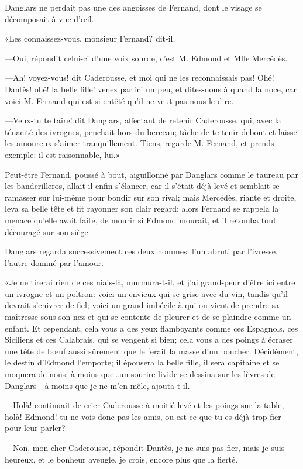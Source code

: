 Danglars ne perdait pas une des angoisses de Fernand, dont le visage se décomposait à vue d'œil.

«Les connaissez-vous, monsieur Fernand? dit-il.

—Oui, répondit celui-ci d'une voix sourde, c'est M. Edmond et Mlle Mercédès.

—Ah! voyez-vous! dit Caderousse, et moi qui ne les reconnaissais pas! Ohé! Dantès! ohé! la belle fille! venez par ici un peu, et dites-nous à quand la noce, car voici M. Fernand qui est si entêté qu'il ne veut pas nous le dire.

—Veux-tu te taire! dit Danglars, affectant de retenir Caderousse, qui, avec la ténacité des ivrognes, penchait hors du berceau; tâche de te tenir debout et laisse les amoureux s'aimer tranquillement. Tiens, regarde M. Fernand, et prends exemple: il est raisonnable, lui.»

Peut-être Fernand, poussé à bout, aiguillonné par Danglars comme le taureau par les banderilleros, allait-il enfin s'élancer, car il s'était déjà levé et semblait se ramasser sur lui-même pour bondir sur son rival; mais Mercédès, riante et droite, leva sa belle tête et fit rayonner son clair regard; alors Fernand se rappela la menace qu'elle avait faite, de mourir si Edmond mourait, et il retomba tout découragé sur son siège.

Danglars regarda successivement ces deux hommes: l'un abruti par l'ivresse, l'autre dominé par l'amour.

«Je ne tirerai rien de ces niais-là, murmura-t-il, et j'ai grand-peur d'être ici entre un ivrogne et un poltron: voici un envieux qui se grise avec du vin, tandis qu'il devrait s'enivrer de fiel; voici un grand imbécile à qui on vient de prendre sa maîtresse sous son nez et qui se contente de pleurer et de se plaindre comme un enfant. Et cependant, cela vous a des yeux flamboyants comme ces Espagnols, ces Siciliens et ces Calabrais, qui se vengent si bien; cela vous a des poings à écraser une tête de bœuf aussi sûrement que le ferait la masse d'un boucher. Décidément, le destin d'Edmond l'emporte; il épousera la belle fille, il sera capitaine et se moquera de nous; à moins que\dots un sourire livide se dessina sur les lèvres de Danglars—à moins que je ne m'en mêle, ajouta-t-il.

—Holà! continuait de crier Caderousse à moitié levé et les poings sur la table, holà! Edmond! tu ne vois donc pas les amis, ou est-ce que tu es déjà trop fier pour leur parler?

—Non, mon cher Caderousse, répondit Dantès, je ne suis pas fier, mais je suis heureux, et le bonheur aveugle, je crois, encore plus que la fierté.

